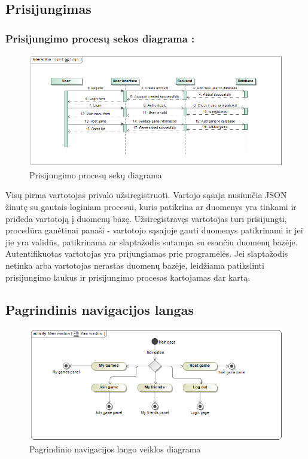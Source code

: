 \documentclass{VUMIFPSkursinis}
\begin{document}
	\subsection{Prisijungimas}
		\subsubsection*{Prisijungimo procesų sekos diagrama :}
		\begin{figure}[H]
			\centering
			\includegraphics[scale=0.5]{img/Login_sequence}
			\caption{Prisijungimo procesų sekų diagrama}
			\label{img:MainWindow_activity}
		\end{figure}
		Visų pirma vartotojas privalo užsiregistruoti. Vartojo sąsaja nusiunčia JSON 
		žinutę su gautais loginiam procesui, kuris patikrina ar duomenys yra tinkami ir
		prideda vartotoją į duomenų bazę. Užsiregistravęs vartotojas turi prisijungti,
		procedūra ganėtinai panaši - vartotojo sąsajoje gauti duomenys patikrinami ir 
		jei jie yra validūs, patikrinama ar slaptažodis sutampa su esančiu duomenų
		bazėje. Autentifikuotas vartotojas yra prijungiamas prie programėlės. 
		Jei slaptažodis netinka arba vartotojas nerastas duomenų bazėje, leidžiama
		patikslinti prisijungimo laukus ir prisijungimo procesas kartojamas dar kartą.

	\subsection{Pagrindinis navigacijos langas}
		\begin{figure}[H]
			\centering
			\includegraphics[scale=0.5]{img/MainWindow_activity}
			\caption{Pagrindinio navigacijos lango veiklos diagrama}
			\label{img:MainWindow_activity}
		\end{figure}
\end{document}
